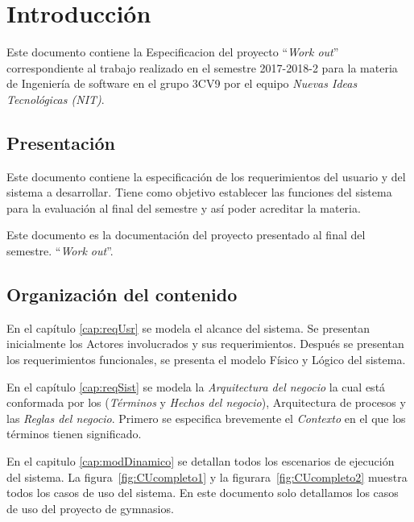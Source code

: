 \chapter{Introducción}


	Este documento contiene la Especificacion del proyecto ``{\em Work out}'' correspondiente al trabajo realizado en el semestre 2017-2018-2 para la materia de Ingeniería de software en el grupo 3CV9 por el equipo {\em Nuevas Ideas Tecnológicas (NIT)}.

\section{Presentación}


	Este documento contiene la especificación de los requerimientos del usuario y del sistema a desarrollar. Tiene como objetivo establecer las funciones del sistema para la evaluación al final del semestre y así poder acreditar la materia. 
	
	Este documento es la documentación del proyecto presentado al final del semestre. ``{\em Work out}''.
	
\section{Organización del contenido}

	En el capítulo \ref{cap:reqUsr} se modela el alcance del sistema. Se presentan inicialmente los Actores involucrados y sus requerimientos. Después se presentan los requerimientos funcionales, se presenta el modelo Físico y Lógico del sistema.
	
	En el capítulo \ref{cap:reqSist} se modela la {\em Arquitectura del negocio} la cual está conformada por los ({\em Términos} y {\em Hechos del negocio}), Arquitectura de procesos y las {\em Reglas del negocio}. Primero se especifica brevemente el {\em Contexto} en el que los términos tienen significado.
	
	En el capitulo \ref{cap:modDinamico} se detallan todos los escenarios de ejecución del sistema. La figura~\ref{fig:CUcompleto1}  y la figurara~\ref{fig:CUcompleto2} muestra todos los casos de uso del sistema. En este documento solo detallamos los casos de uso del proyecto de gymnasios.
	
